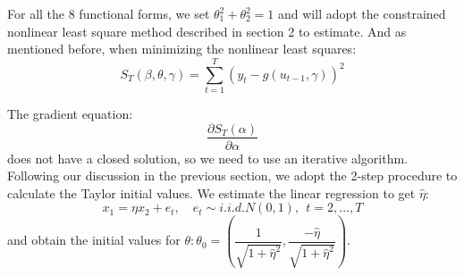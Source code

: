 \documentclass[a4paper,12pt,times,numbered,print,index]{report}
\numberwithin{equation}{section}
\begin{document}
For all the 8 functional forms, we set $\theta^2_{1}+\theta_{2}^2 = 1$ and will adopt the constrained nonlinear least square method described in section 2 to estimate. And as mentioned before, when minimizing the nonlinear least squares:
$$
S_{T}(\beta, \theta, \gamma)=\sum_{t=1}^{T}\left(y_{t}-g\left(u_{t-1}, \gamma\right)\right)^{2}
$$

The gradient equation:
$$
\frac{\partial S_{T}(\alpha)}{\partial \alpha}
$$
does not have a closed solution, so we need to use an iterative algorithm. Following our discussion in the previous section, we adopt the 2-step procedure to calculate the Taylor initial values. We estimate the linear regression to get $\hat{\eta}$:
$$
x_1 = \eta x_2 + e_t, \quad e_{t}\sim i.i.d.N\left( 0,1\right) ,\ \ t=2,...,T
$$
and obtain the initial values for $\theta:\theta_{0} = (\dfrac{1}{\sqrt{1+\hat{\eta}^2}}, \dfrac{-\hat{\eta}}{\sqrt{1+\hat{\eta}^2}})$.
\end{document}
